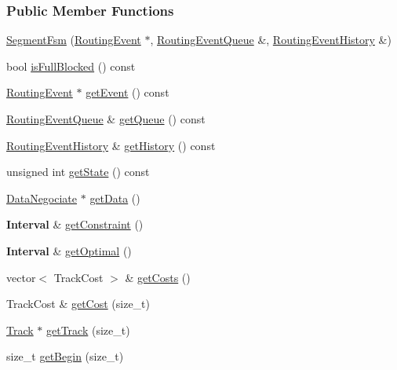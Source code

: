 \subsubsection*{Public Member Functions}
\begin{DoxyCompactItemize}
\item 
\hyperlink{classKite_1_1SegmentFsm_a2a8eadaaf3ed213914e7b4a81cae6e6a}{Segment\-Fsm} (\hyperlink{classKite_1_1RoutingEvent}{Routing\-Event} $\ast$, \hyperlink{classKite_1_1RoutingEventQueue}{Routing\-Event\-Queue} \&, \hyperlink{classKite_1_1RoutingEventHistory}{Routing\-Event\-History} \&)
\item 
bool \hyperlink{classKite_1_1SegmentFsm_a3ef3c57ba69b7080a796c27debdd3c28}{is\-Full\-Blocked} () const 
\item 
\hyperlink{classKite_1_1RoutingEvent}{Routing\-Event} $\ast$ \hyperlink{classKite_1_1SegmentFsm_a279d639cfaa447720f30991496f706a0}{get\-Event} () const 
\item 
\hyperlink{classKite_1_1RoutingEventQueue}{Routing\-Event\-Queue} \& \hyperlink{classKite_1_1SegmentFsm_a66732f08ae2025bec520976215b5a0bd}{get\-Queue} () const 
\item 
\hyperlink{classKite_1_1RoutingEventHistory}{Routing\-Event\-History} \& \hyperlink{classKite_1_1SegmentFsm_a20d32c819dde942df1ed94db88b623a2}{get\-History} () const 
\item 
unsigned int \hyperlink{classKite_1_1SegmentFsm_aeff84fdf6cc443a2c7a7bd33b03e871f}{get\-State} () const 
\item 
\hyperlink{classKite_1_1DataNegociate}{Data\-Negociate} $\ast$ \hyperlink{classKite_1_1SegmentFsm_ad272e2f3fbbddcd6c8dc2f0187f08c4e}{get\-Data} ()
\item 
{\bf Interval} \& \hyperlink{classKite_1_1SegmentFsm_abf6603c742bee65a4effa24135f2d955}{get\-Constraint} ()
\item 
{\bf Interval} \& \hyperlink{classKite_1_1SegmentFsm_a9d1a7f4108b49d3096d8c733fabe60f3}{get\-Optimal} ()
\item 
vector$<$ Track\-Cost $>$ \& \hyperlink{classKite_1_1SegmentFsm_ab7144079976c8808e69f9aac68dda06d}{get\-Costs} ()
\item 
Track\-Cost \& \hyperlink{classKite_1_1SegmentFsm_a5256595f77ebc80c3ee683cfdbc7f8f6}{get\-Cost} (size\-\_\-t)
\item 
\hyperlink{classKite_1_1Track}{Track} $\ast$ \hyperlink{classKite_1_1SegmentFsm_af2d9a3a5df8a4de5d263fb3fae563a8a}{get\-Track} (size\-\_\-t)
\item 
size\-\_\-t \hyperlink{classKite_1_1SegmentFsm_a13a1ec8bdcf29f2bcb21cab348b77ed2}{get\-Begin} (size\-\_\-t)

\end{DoxyCompactItemize}
